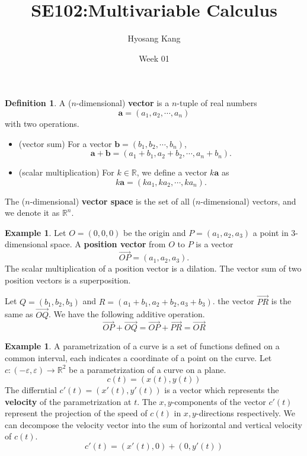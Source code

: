 \documentclass{beamer}
\title[]{SE102:Multivariable Calculus}
\author[]{Hyosang Kang\inst{1}}
\institute[]{\inst{1}Division of Mathematics\\ School of Interdisciplinary Studies\\ DGIST}
\date[]{Week 01}
\theoremstyle{plain}
\theoremstyle{definition}
\newtheorem{defn}[thm]{Definition}
\newtheorem{exmp}[thm]{Example}
\newcommand{\varep}{\varepsilon}
\begin{document}
\begin{frame}
\titlepage
\end{frame}

\begin{frame}
\begin{defn}\label{defn-vec}
A ($n$-dimensional) \textbf{vector} is a $n$-tuple of real numbers 
	$$\mathbf a=(a_1,a_2,\cdots,a_n)$$
with two operations.
	\begin{itemize}
	\item (vector sum) For a vector $\mathbf b = (b_1,b_2,\cdots,b_n)$,
		$$\mathbf a+\mathbf b=(a_1+b_1,a_2+b_2,\cdots,a_n+b_n).$$
	\item (scalar multiplication) For $k\in\mathbb R$, we define a vector $k\mathbf a$ as
		$$k\mathbf a=(ka_1,ka_2,\cdots,ka_n).$$
	\end{itemize}

The ($n$-dimensional) \textbf{vector space} is the set 
of all ($n$-dimensional) vectors, and we denote it as $\mathbb R^n$.
\end{defn}
\end{frame}

\begin{frame}
\begin{exmp}
Let $O=(0,0,0)$ be the origin and $P=(a_1,a_2,a_3)$ a point in $3$-dimensional space.
A \textbf{position vector} from $O$ to $P$ is a vector 
	$$\overrightarrow{OP}=(a_1,a_2,a_3).$$
The scalar multiplication of a position vector is a dilation.
The vector sum of two position vectors is a superposition.

Let $Q=(b_1,b_2,b_3)$ and $R=(a_1+b_1,a_2+b_2,a_3+b_3)$.
the vector $\overrightarrow{PR}$ is the same as $\overrightarrow{OQ}$.
We have the following additive operation.
	$$\overrightarrow{OP}+\overrightarrow{OQ}=\overrightarrow{OP}+\overrightarrow{PR}=\overrightarrow{OR}$$
\end{exmp}
\end{frame}

\begin{frame}
\begin{exmp}
A parametrization of a curve is a set of functions defined on a common interval,
each indicates a coordinate of a point on the curve.
Let $c:(-\varep,\varep)\rightarrow\mathbb R^2$ be a parametrization of a curve on a plane.
	$$c(t)=(x(t),y(t))$$
The differntial $c'(t)=(x'(t),y'(t))$ is a vector which represents 
the \textbf{velocity} of the parametrization at $t$. 
The $x,y$-components of the vector $c'(t)$ represent 
the projection of the speed of $c(t)$ in $x,y$-directions respectively.
We can decompose the velocity vector into the sum of horizontal and vertical velocity of $c(t)$.
	$$c'(t) = (x'(t),0)+(0,y'(t))$$
\end{exmp}
\end{frame}
\end{document}
